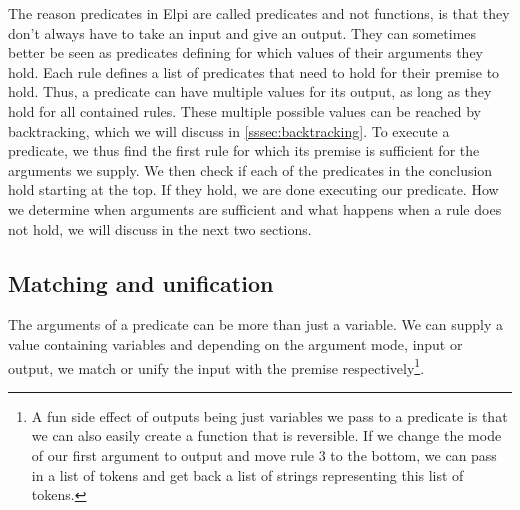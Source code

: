 \documentclass[thesis.tex]{subfiles}
\begin{document}
{{The reason predicates in Elpi are called predicates and not functions, is that they don't always have to take an input and give an output. They can sometimes better be seen as predicates defining for which values of their arguments they hold. Each rule defines a list of predicates that need to hold for their premise to hold. Thus, a predicate can have multiple values for its output, as long as they hold for all contained rules. These multiple possible values can be reached by backtracking, which we will discuss in \cref{sssec:backtracking}. To execute a predicate, we thus find the first rule for which its premise is sufficient for the arguments we supply. We then check if each of the predicates in the conclusion hold starting at the top. If they hold, we are done executing our predicate. How we determine when arguments are sufficient and what happens when a rule does not hold, we will discuss in the next two sections.

\subsection{Matching and unification}\label{sssec:mandu}
The arguments of a predicate can be more than just a variable. We can supply a value containing variables and depending on the argument mode, input or output, we match or unify the input with the premise respectively\footnote{A fun side effect of outputs being just variables we pass to a predicate is that we can also easily create a function that is reversible. If we change the mode of our first argument to output and move rule 3 to the bottom, we can pass in a list of tokens and get back a list of strings representing this list of tokens.}.

}}
\end{document}
